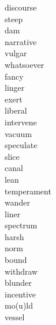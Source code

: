 \documentclass[b5paper, 11pt]{ctexart}
\begin{document}
\begin{multicols*}{3}
\begin{description}
\item[discourse]

\item[steep]

\item[dam]

\item[narrative]

\item[vulgar]

\item[whatsoever]

\item[fancy]

\item[linger]

\item[exert]

\item[liberal]

\item[intervene]

\item[vacuum]

\item[speculate]

\item[slice]

\item[canal]

\item[lean]

\item[temperament]

\item[wander]

\item[liner]

\item[spectrum]

\item[harsh]

\item[norm]

\item[bound]

\item[withdraw]

\item[blunder]

\item[incentive]

\item[mo(u)ld]

\item[vessel]


\end{description}
\end{multicols*}
\end{document}
